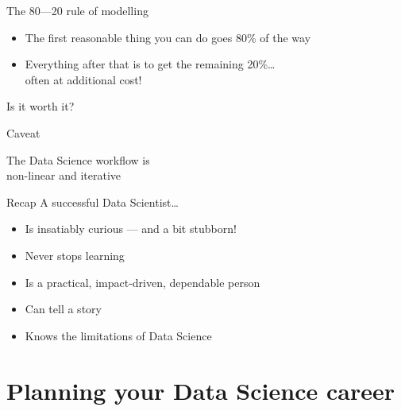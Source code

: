 \begin{frame}{The 80---20 rule of modelling}
    \begin{itemize}
        \item The first \alert{reasonable} thing you can do goes 80\% of the way
        \item Everything after that is to get the remaining 20\%\ldots \\
              often at additional cost!
    \end{itemize}
    \vfill\pause
    \begin{center}
        \LARGE%
        Is it worth it?
    \end{center}
\end{frame}

\begin{frame}{Caveat}
    \begin{center}
        {\Large%
         The Data Science workflow is} \\[\bigskipamount]
        {\LARGE%
         \alert{non\hyp{}linear} and \alert{iterative}} \\[2\bigskipamount]
    \end{center}
\end{frame}

\begin{frame}{Recap}
    A successful Data Scientist\ldots
    \begin{itemize}
        \item Is insatiably curious --- and a bit stubborn!
        \item Never stops learning
        \item Is a practical, impact\hyp{}driven, dependable person
        \item Can tell a story
        \item Knows the limitations of Data Science
    \end{itemize}
\end{frame}

\section[Planning your \\ Data Science career]%
        {Planning your Data Science career}

